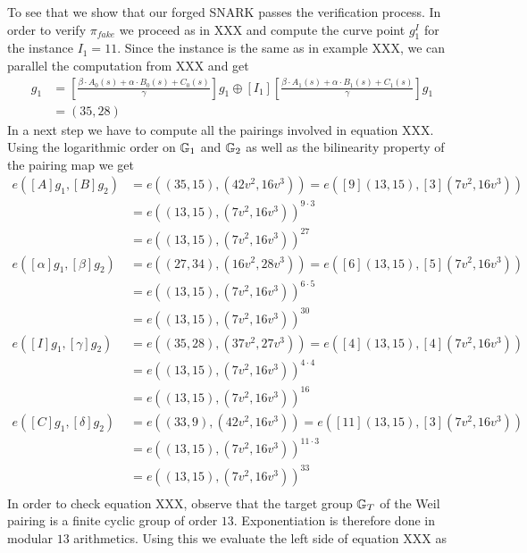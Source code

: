 \begin{example}
To see that we show that our forged SNARK passes the verification process. In order to verify $\pi_{fake}$ we proceed as in XXX and compute the curve point $g_1^I$ for the instance $I_1=11$. Since the instance is the same as in example XXX, we can parallel the computation from XXX and get
\begin{align*}
[I]g_1 & = [\frac{\beta\cdot A_{0}(s)+\alpha\cdot B_{0}(s)+C_{0}(s)}{\gamma}]g_1 \oplus [I_1][\frac{\beta\cdot A_{1}(s)+\alpha\cdot B_{1}(s)+C_{1}(s)}{\gamma}]g_1\\
       & = (35,28)
\end{align*} 
In a next step we have to compute all the pairings involved in equation XXX. Using the logarithmic order on $\mathbb{G}_1$ and $\mathbb{G}_2$ as well as the bilinearity property of the pairing map we get
\begin{align*}
e([A]g_1,[B]g_2) & = e((35,15),(42v^2,16v^3))
                   = e([9](13,15),[3](7v^2,16v^3))\\
               & = e((13,15),(7v^2,16v^3))^{9\cdot 3}\\ 
               & = e((13,15),(7v^2,16v^3))^{27}\\
e([\alpha]g_1,[\beta]g_2) & = e((27,34),(16v^2,28v^3)) 
                            = e([6](13,15),[5](7v^2,16v^3))\\
               & = e((13,15),(7v^2,16v^3))^{6\cdot 5}\\
               & = e((13,15),(7v^2,16v^3))^{30}\\   
e([I]g_1,[\gamma]g_2) & = e((35,28),(37v^2,27v^3)) 
                            = e([4](13,15),[4](7v^2,16v^3))\\
               & = e((13,15),(7v^2,16v^3))^{4\cdot 4}\\
               & = e((13,15),(7v^2,16v^3))^{16}\\ 
e([C]g_1,[\delta]g_2) & = e((33,9),(42v^2,16v^3)) 
                            = e([11](13,15),[3](7v^2,16v^3))\\
               & = e((13,15),(7v^2,16v^3))^{11\cdot 3}\\
               & = e((13,15),(7v^2,16v^3))^{33}\\                                             
\end{align*}  
In order to check equation XXX, observe that the target group $\mathbb{G}_T$ of the Weil pairing is a finite cyclic group of order $13$. Exponentiation is therefore done in modular $13$ arithmetics. Using this we evaluate the left side of equation XXX as  

\end{example}
